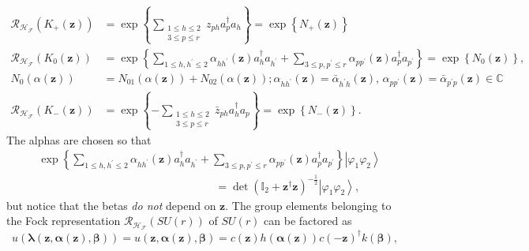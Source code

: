 \documentclass[aps,preprint]{revtex4}%
\begin{document}
\begin{align}
\mathcal{R}_{\mathcal{H}_{\mathcal{F}}}\left(  K_{+}\left(  \mathbf{z}\right)
\right)   &  =\exp\left\{  \sum\limits_{\substack{1\leq h\leq2\\3\leq p\leq
r}}z_{ph}a_{p}^{\dagger}a_{h}\right\}  =\exp\left\{  N_{+}\left(
\mathbf{z}\right)  \right\} \nonumber\\
\mathcal{R}_{\mathcal{H}_{\mathcal{F}}}\left(  K_{0}\left(  \mathbf{z}\right)
\right)   &  =\exp\left\{  \sum\limits_{1\leq h,h^{\prime}\leq2}%
\alpha_{hh^{\prime}}\left(  \mathbf{z}\right)  a_{h}^{\dagger}a_{h^{\prime}%
}+\sum\limits_{3\leq p,p^{\prime}\leq r}\alpha_{pp^{\prime}}\left(
\mathbf{z}\right)  a_{p}^{\dagger}a_{p^{\prime}}\right\}  =\exp\left\{
N_{0}\left(  \mathbf{z}\right)  \right\}  ,\,\nonumber\\
N_{0}\left(  \alpha\left(  \mathbf{z}\right)  \right)   &  =N_{01}\left(
\alpha\left(  \mathbf{z}\right)  \right)  +N_{02}\left(  \alpha\left(
\mathbf{z}\right)  \right)  ;\alpha_{hh^{\prime}}\left(  \mathbf{z}\right)
=\bar{\alpha}_{h^{\prime}h}\left(  \mathbf{z}\right)  ,\,\alpha_{pp^{\prime}%
}\left(  \mathbf{z}\right)  =\bar{\alpha}_{p^{\prime}p}\left(  \mathbf{z}%
\right)  \in\mathbb{C}\nonumber\\
\mathcal{R}_{\mathcal{H}_{\mathcal{F}}}\left(  K_{-}\left(  \mathbf{z}\right)
\right)   &  =\exp\left\{  -\sum\limits_{\substack{1\leq h\leq2\\3\leq p\leq
r}}\bar{z}_{ph}a_{h}^{\dagger}a_{p}\right\}  =\exp\left\{  N_{-}\left(
\mathbf{z}\right)  \right\}  .
\end{align}
The alphas are chosen so that
\begin{align}
&  \exp\left\{  \sum\limits_{1\leq h,h^{\prime}\leq2}\alpha_{hh^{\prime}%
}\left(  \mathbf{z}\right)  a_{h}^{\dagger}a_{h^{\prime}}+\sum\limits_{3\leq
p,p^{\prime}\leq r}\alpha_{pp^{\prime}}\left(  \mathbf{z}\right)
a_{p}^{\dagger}a_{p^{\prime}}\right\}  \left\vert \varphi_{1}\varphi
_{2}\right\rangle \nonumber\\
&  \qquad\qquad\qquad\qquad\qquad\qquad\qquad\qquad\left.  =\right.
\det\left(  \mathbb{I}_{2}+\mathbf{z}^{\dagger}\mathbf{z}\right)  ^{-\frac
{1}{2}}\left\vert \varphi_{1}\varphi_{2}\right\rangle ,
\end{align}
but notice that the betas \emph{do not }depend on $\mathbf{z.}$ The group
elements belonging to the Fock representation $\mathcal{R}_{\mathcal{H}%
_{\mathcal{F}}}\left(  SU\left(  r\right)  \right)  $ of $SU\left(  r\right)
$ can be factored as
\begin{equation}
u\left(  \mathbf{\lambda}\left(  \mathbf{z,\alpha\left(  \mathbf{z}\right)
,\beta}\right)  \right)  =u\left(  \mathbf{z,\alpha\left(  \mathbf{z}\right)
,\beta}\right)  =c\left(  \mathbf{z}\right)  h\left(  \mathbf{\alpha}\left(
\mathbf{z}\right)  \right)  c\left(  -\mathbf{z}\right)  ^{\dagger}k\left(
\mathbf{\beta}\right)  ,
\end{equation}
\end{document}
